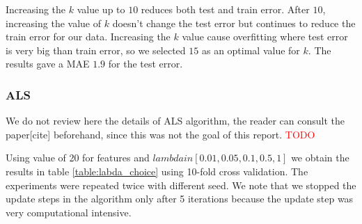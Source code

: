 Increasing the $k$ value up to $10$ reduces both test and train error. After $10$, increasing the value of $k$ doesn't change the test error but continues to reduce the train error for our data. Increasing the $k$ value cause overfitting where test error is very big than train error, so we selected $15$ as an optimal value for $k$. The results gave a MAE $1.9$ for the test error. 

\subsubsection{ALS}
We do not review here the details of ALS algorithm, the reader can consult the paper[cite] beforehand, since this was not the goal of this report.
\textcolor{red}{TODO}

Using value of 20 for features and $lambda in [0.01,0.05,0.1,0.5,1]$ we obtain the results in table \ref{table:labda_choice} using 10-fold cross validation. The experiments were repeated twice with different seed. We note that we stopped the update steps in the algorithm only after 5 iterations because the update step was very computational intensive.

